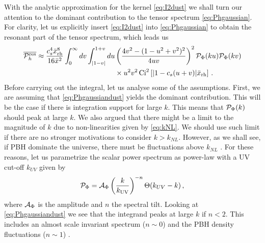 \documentclass[a4paper,11pt]{article}
\numberwithin{equation}{section}
\begin{document}
With the analytic approximation for the kernel \eqref{eq:I2dust} we shall turn our attention to the dominant contribution to the tensor spectrum \eqref{eq:Phgaussian}. For clarity, let us explicitly insert \eqref{eq:I2dust} into \eqref{eq:Phgaussian} to obtain the resonant part of the tensor spectrum, which leads us 
\begin{align}\label{eq:Phgaussiandust}
\overline{{\cal P}^{\rm res}_h}\approx\frac{c_s^4{\bar x_{\rm rh}^8}}{16\bar x^2}\int_0^\infty dv\int_{|1-v|}^{1+v}du&\left(\frac{4v^2-(1-u^2+v^2)^2}{4uv}\right)^2{{\cal P}_{\Phi}(ku)}{{\cal P}_{\Phi}(kv)}\nonumber\\&\times u^2v^2\,{\rm Ci}^2\left[|1-c_s(u+v)|\bar x_{\rm rh}\right]\,.
\end{align}
Before carrying out the integral, let us analyse some of the assumptions. First, we are assuming that \eqref{eq:Phgaussiandust} yields the dominant contribution. This will be the case if there is integration support for large $k$. This means that ${\cal P}_{\Phi}(k)$ should peak at large $k$. We also argued that there might be a limit to the magnitude of $k$ due to non-linearities given by \eqref{eq:kNL}. We should use such limit if there are no stronger motivations to consider $k>k_{NL}$. However, as we shall see, if PBH dominate the universe, there must be fluctuations above $k_{NL}$ \cite{Papanikolaou:2020qtd}. For these reasons, let us parametrize the scalar power spectrum as power-law with a UV cut-off $k_{UV}$ given by \cite{Domenech:2021wkk}
\begin{align}\label{eq:pphidust}
{\cal P}_{\Phi}={\cal A}_\Phi\left(\frac{k}{k_{\rm UV}}\right)^{-n}\Theta(k_{UV}-k)\,,
\end{align}
where ${\cal A}_\Phi$ is the amplitude and $n$ the spectral tilt. Looking at \eqref{eq:Phgaussiandust} we see that the integrand peaks at large $k$ if $n<2$. This includes an almost scale invariant spectrum ($n\sim 0$) and the PBH density fluctuations ($n\sim 1$) \cite{Papanikolaou:2020qtd,Domenech:2020ssp}.
\end{document}
